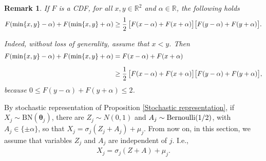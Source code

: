 \documentclass[12pt]{article}
\newtheorem{remark}[theorem]{Remark}
\theoremstyle{definition}
\begin{document}
\begin{remark}\label{rem-H}
If $F$ is a CDF, for all $x,y\in \mathbb{R}^2$ and $\alpha\in\mathbb{R}$, the following holds
\begin{align*}
F(\min\{x,y\}-\alpha)
+
F(\min\{x,y\}+\alpha)
\geq
{1\over 2}\, \big[
F(x-\alpha)
+
F(x+\alpha)
\big]
\big[
F(y-\alpha)
+
F(y+\alpha)
\big].
\end{align*}

Indeed, without loss of generality, assume that $x<y$. Then
\begin{align*}
F(\min\{x,y\}-\alpha)
+
F(\min\{x,y\}+\alpha)
&=
F(x-\alpha)
+
F(x+\alpha)
\\[0,2cm]
&\geq
{1\over 2}\, \big[
F(x-\alpha)
+
F(x+\alpha)
\big]
\big[
F(y-\alpha)
+
F(y+\alpha)
\big],
\end{align*}
because 
$0\leq F(y-\alpha)
+
F(y+\alpha)\leq 2$.
\end{remark}

By stochastic representation of Proposition \ref{Stochastic representation}, if $X_j\sim \text{BN}(\boldsymbol{\theta}_j)$, there are $Z_j\sim N(0,1)$ and $A_j\sim {\rm Bernoulli}(1/2)$, with $A_j\in\{\pm\alpha\}$, so that $X_j=\sigma_j(Z_j+A_j)+\mu_j$. From now on, in this section, we assume that variables $Z_j$ and $A_j$ are independent of $j$. I.e., 
\begin{align}\label{rep-stoch}
X_j=\sigma_j(Z+A)+\mu_j.
\end{align}
\end{document}
